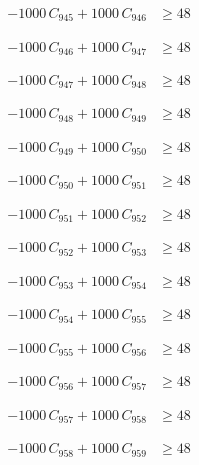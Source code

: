 \documentclass[a4paper,11pt]{article}
\begin{document}
\begin{align}
-1000\,C_{945} + 1000\,C_{946} &\geq 48 \nonumber
\end{align}

\begin{align}
-1000\,C_{946} + 1000\,C_{947} &\geq 48 \nonumber
\end{align}

\begin{align}
-1000\,C_{947} + 1000\,C_{948} &\geq 48 \nonumber
\end{align}

\begin{align}
-1000\,C_{948} + 1000\,C_{949} &\geq 48 \nonumber
\end{align}

\begin{align}
-1000\,C_{949} + 1000\,C_{950} &\geq 48 \nonumber
\end{align}

\begin{align}
-1000\,C_{950} + 1000\,C_{951} &\geq 48 \nonumber
\end{align}

\begin{align}
-1000\,C_{951} + 1000\,C_{952} &\geq 48 \nonumber
\end{align}

\begin{align}
-1000\,C_{952} + 1000\,C_{953} &\geq 48 \nonumber
\end{align}

\begin{align}
-1000\,C_{953} + 1000\,C_{954} &\geq 48 \nonumber
\end{align}

\begin{align}
-1000\,C_{954} + 1000\,C_{955} &\geq 48 \nonumber
\end{align}

\begin{align}
-1000\,C_{955} + 1000\,C_{956} &\geq 48 \nonumber
\end{align}

\begin{align}
-1000\,C_{956} + 1000\,C_{957} &\geq 48 \nonumber
\end{align}

\begin{align}
-1000\,C_{957} + 1000\,C_{958} &\geq 48 \nonumber
\end{align}

\begin{align}
-1000\,C_{958} + 1000\,C_{959} &\geq 48 \nonumber
\end{align}
\end{document}
